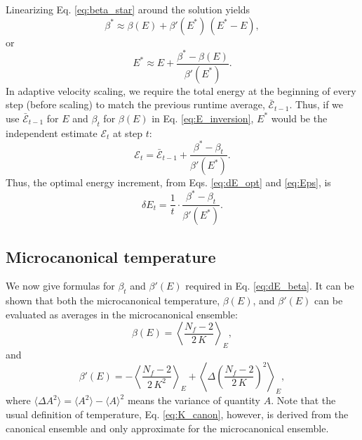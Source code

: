 \documentclass[reprint]{revtex4-1}
\begin{document}
Linearizing Eq. \eqref{eq:beta_star} around the solution
yields
%
\begin{equation*}
\beta^*
\approx
\beta( E )
+
\beta'( E^* ) \, ( E^* - E )
,
\end{equation*}
%
or
%
\begin{equation}
E^*
\approx
E
+
\frac{ \beta^* - \beta(E) }
     { \beta'(E^*) }
.
\label{eq:E_inversion}
\end{equation}
%
In adaptive velocity scaling,
we require the total energy at the beginning of every step
(before scaling) to match the previous runtime average,
$\bar{\mathcal E}_{t - 1}$.
%
Thus, if we use $\bar{\mathcal E}_{t - 1}$ for $E$
and $\beta_t$ for $\beta(E)$
in Eq. \eqref{eq:E_inversion},
$E^*$ would be the independent estimate
$\mathcal E_{t}$ at step $t$:
%
%
\begin{equation}
\mathcal E_t
=
\bar{\mathcal E}_{t - 1}
+
\frac{ \beta^* - \beta_t }
     { \beta'(E^*) }
.
\label{eq:Eps}
\end{equation}
%
Thus, the optimal energy increment,
from Eqs. \eqref{eq:dE_opt} and \eqref{eq:Eps},
is
%
\begin{equation}
\delta E_t
=
\frac{ 1 } { t }
\cdot
\frac{ \beta^* - \beta_t }
     { \beta'(E^*) }
.
\label{eq:dE_beta}
\end{equation}
%



\subsection{Microcanonical temperature}


We now give formulas for $\beta_t$
and $\beta'(E)$ required in Eq. \eqref{eq:dE_beta}.
%
It can be shown that both the microcanonical temperature, $\beta(E)$,
and $\beta'(E)$ can be evaluated as
averages in the microcanonical ensemble\cite{rugh1997, frenkel}:
%
\begin{equation}
  \beta(E)
  =
  \left\langle
    \frac{ N_f - 2 }
         { 2 \, K }
  \right\rangle_E
  ,
  \label{eq:betaE_invK}
\end{equation}
%
and
%
\begin{equation}
  \beta'(E)
  =
  - \left\langle
      \frac{ N_f - 2 }
           { 2 \, K^2 }
    \right\rangle_E
  + \left\langle
      \Delta\left(
        \frac{ N_f - 2 }
             { 2 \, K }
      \right)^2
    \right\rangle_E
  ,
  \label{eq:dbetadE}
\end{equation}
%
where
$\langle \Delta A^2 \rangle = \langle A^2 \rangle - \langle A \rangle^2$
means the variance of quantity $A$.
%
Note that the usual definition of temperature, Eq. \eqref{eq:K_canon},
however, is derived from the canonical ensemble and
only approximate for the microcanonical ensemble.
\end{document}
